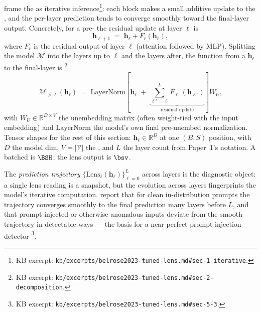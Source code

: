 \citet{belrose2023-tuned-lens} frame the  as iterative
inference\footnote{KB excerpt: \nolinkurl{kb/excerpts/belrose2023-tuned-lens.md#sec-1-iterative}.}:
each block makes a small additive update to the , and
the per-layer prediction tends to converge smoothly toward the
final-layer output. Concretely, for a pre-  the
residual update at layer $\ell$ is
\begin{equation}
  \mathbf{h}_{\ell+1} \;=\; \mathbf{h}_\ell + F_\ell(\mathbf{h}_\ell),
  \label{eq:residual-update}
\end{equation}
where $F_\ell$ is the residual output of layer $\ell$ (attention
followed by MLP). Splitting the model $\mathcal{M}$ into the layers up
to $\ell$ and the layers after, the function from a 
$\mathbf{h}_\ell$ to the final-layer  is
\citep[\S 2, Eq.~2]{belrose2023-tuned-lens}\footnote{KB excerpt:
\nolinkurl{kb/excerpts/belrose2023-tuned-lens.md#sec-2-decomposition}.}
\begin{equation}
  \mathcal{M}_{>\ell}(\mathbf{h}_\ell)
  \;=\;
  \mathrm{LayerNorm}\!\left[\mathbf{h}_\ell
  \;+\;\underbrace{\sum_{\ell'=\ell}^{L} F_{\ell'}(\mathbf{h}_{\ell'})}_{\text{residual update}}\right]\!W_U,
  \label{eq:residual-decomp}
\end{equation}
with $W_U \in \mathbb{R}^{D \times V}$ the unembedding matrix (often
weight-tied with the input embedding) and $\mathrm{LayerNorm}$ the
model's own final pre-unembed normalization. Tensor shapes for the
rest of this section:  $\mathbf{h}_\ell \in \mathbb{R}^D$
at one $(B, S)$ position, with $D$ the model dim, $V = |\mathcal{V}|$
the , and $L$ the layer count from Paper~1's notation. A
batched  is $\BSH$;
the lens output is $\bsv$.

The \emph{prediction trajectory}
$\{\mathrm{Lens}_\ell(\mathbf{h}_\ell)\}_{\ell=0}^L$ across layers is
the diagnostic object: a single lens reading is a snapshot, but the
evolution across layers fingerprints the model's iterative computation.
\citet[\S 1]{belrose2023-tuned-lens} report that for clean
in-distribution prompts the trajectory converges smoothly to the final
prediction many layers before $L$, and that prompt-injected or
otherwise anomalous inputs deviate from the smooth trajectory in
detectable ways — the basis for a near-perfect prompt-injection
detector \citep[\S 5.3]{belrose2023-tuned-lens}\footnote{KB excerpt:
\nolinkurl{kb/excerpts/belrose2023-tuned-lens.md#sec-5-3}.}.


